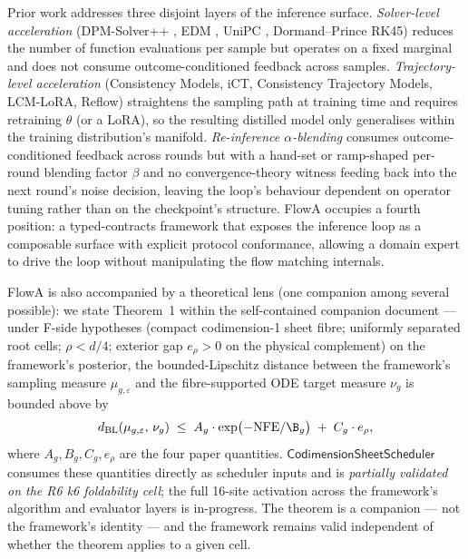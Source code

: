 \documentclass[journal,twocolumn,final]{IEEEtran}
\newcommand{\NFE}{\mathrm{NFE}}
\newcommand{\egap}{e_\rho}
\newcommand{\sheetA}{A_g}
\newcommand{\sheetB}{B_g}
\newcommand{\sheetC}{C_g}
\begin{document}
Prior work addresses three disjoint layers of the inference surface.
\emph{Solver-level acceleration} (DPM-Solver++ \cite{lu2022dpm}, EDM
\cite{karras2022edm}, UniPC \cite{zhao2023unipc}, Dormand--Prince RK45)
reduces the number of function evaluations per sample but operates on a fixed
marginal and does not consume outcome-conditioned feedback across samples.
\emph{Trajectory-level acceleration} (Consistency Models, iCT, Consistency
Trajectory Models, LCM-LoRA, Reflow) straightens the sampling path at training
time and requires retraining $\theta$ (or a LoRA), so the resulting distilled
model only generalises within the training distribution's manifold.
\emph{Re-inference $\alpha$-blending} \cite{sabour2024,sabour2024fastdllm,yu2024abcache,zwick2025lediflow}
consumes outcome-conditioned feedback across rounds but with a hand-set or
ramp-shaped per-round blending factor $\beta$ and no convergence-theory
witness feeding back into the next round's noise decision, leaving the loop's
behaviour dependent on operator tuning rather than on the checkpoint's
structure. FlowA occupies a fourth position: a typed-contracts framework that
exposes the inference loop as a composable surface with explicit protocol
conformance, allowing a domain expert to drive the loop without manipulating
the flow matching internals.

FlowA is also accompanied by a theoretical lens (one companion among several
possible): we state Theorem~1 within the self-contained companion document
--- under F-side hypotheses (compact codimension-1 sheet fibre; uniformly
separated root cells; $\rho < d/4$; exterior gap $\egap > 0$ on the physical
complement) on the framework's posterior, the bounded-Lipschitz distance
between the framework's sampling measure $\mu_{g,\varepsilon}$ and the
fibre-supported ODE target measure $\nu_g$ is bounded above by
\begin{equation}\label{eq:thm1}
d_{\mathrm{BL}}(\mu_{g,\varepsilon},\, \nu_g) \;\le\; \sheetA \cdot
\exp\bigl(-\NFE/\B_g\bigr) \;+\; \sheetC \cdot \egap,
\end{equation}
where $\sheetA, \sheetB, \sheetC, \egap$ are the four paper quantities.
$\mathsf{CodimensionSheetScheduler}$ consumes these quantities directly as
scheduler inputs and is \emph{partially validated on the R6 k6 foldability
cell}; the full 16-site activation across the framework's algorithm and
evaluator layers is in-progress. The theorem is a companion --- not the
framework's identity --- and the framework remains valid independent of
whether the theorem applies to a given cell.
\end{document}
